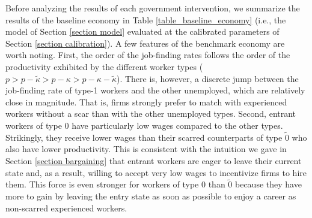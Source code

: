 \documentclass[12pt]{article} %
\theoremstyle{definition}
\begin{document}
Before analyzing the results of each government intervention, we summarize the results of the baseline economy in Table \ref{table_baseline_economy} (i.e., the model of Section \ref{section model} evaluated at the calibrated parameters of Section \ref{section calibration}).
A few features of the benchmark economy are worth noting.
First, the order of the job-finding rates follows the order of the productivity exhibited by the different worker types ($p > p - \tilde{\kappa} > p - \kappa > p - \kappa - \tilde{\kappa}$).
There is, however, a discrete jump between the job-finding rate of type-1 workers and the other unemployed, which are relatively close in magnitude.
That is, firms strongly prefer to match with experienced workers without a scar than with the other unemployed types.
Second, entrant workers of type 0 have particularly low wages compared to the other types.
Strikingly, they receive lower wages than their scarred counterparts of type $\tilde{0}$ who also have lower productivity.
This is consistent with the intuition we gave in Section \ref{section bargaining} that entrant workers are eager to leave their current state and, as a result, willing to accept very low wages to incentivize firms to hire them.
This force is even stronger for workers of type 0 than $\tilde{0}$ because they have more to gain by leaving the entry state as soon as possible to enjoy a career as non-scarred experienced workers.

\end{document}
